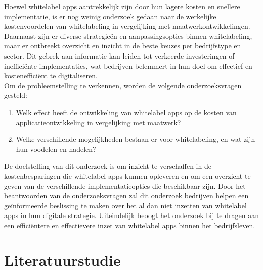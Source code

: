 Hoewel whitelabel apps aantrekkelijk zijn door hun lagere kosten en snellere implementatie, is er nog weinig onderzoek gedaan naar de werkelijke kostenvoordelen van whitelabeling in vergelijking met maatwerkontwikkelingen. 
Daarnaast zijn er diverse strategieën en aanpassingsopties binnen whitelabeling, maar er ontbreekt overzicht en inzicht in de beste keuzes per bedrijfstype en sector. 
Dit gebrek aan informatie kan leiden tot verkeerde investeringen of inefficiënte implementaties, wat bedrijven belemmert in hun doel om effectief en kostenefficiënt te digitaliseren.\\

Om de probleemstelling te verkennen, worden de volgende onderzoeksvragen gesteld:
\begin{enumerate}
  \item Welk effect heeft de ontwikkeling van whitelabel apps op de kosten van applicatieontwikkeling in vergelijking met maatwerk?
  \item Welke verschillende mogelijkheden bestaan er voor whitelabeling, en wat zijn hun voodelen en nadelen?
\end{enumerate}

De doelstelling van dit onderzoek is om inzicht te verschaffen in de kostenbesparingen die whitelabel apps kunnen opleveren en om een overzicht te geven van de verschillende implementatieopties die beschikbaar zijn. 
Door het beantwoorden van de onderzoeksvragen zal dit onderzoek bedrijven helpen een geïnformeerde beslissing te maken over het al dan niet inzetten van whitelabel apps in hun digitale strategie. 
Uiteindelijk beoogt het onderzoek bij te dragen aan een efficiëntere en effectievere inzet van whitelabel apps binnen het bedrijfsleven.


\section{Literatuurstudie}%
\label{sec:literatuurstudie}



